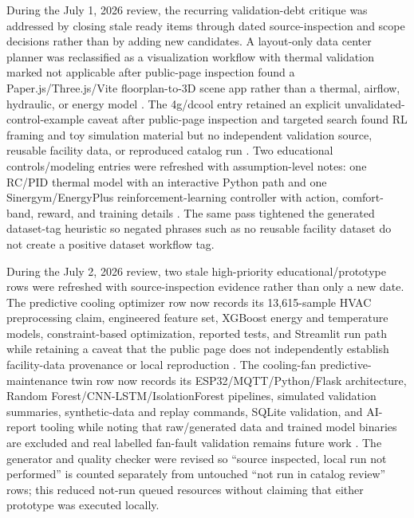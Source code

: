 \documentclass[11pt]{article}
\begin{document}
During the July 1, 2026 review, the recurring validation-debt critique was addressed by closing stale ready items through dated source-inspection and scope decisions rather than by adding new candidates. A layout-only data center planner was reclassified as a visualization workflow with thermal validation marked not applicable after public-page inspection found a Paper.js/Three.js/Vite floorplan-to-3D scene app rather than a thermal, airflow, hydraulic, or energy model \cite{DatacenterPlanner2026}. The 4g/dcool entry retained an explicit unvalidated-control-example caveat after public-page inspection and targeted search found RL framing and toy simulation material but no independent validation source, reusable facility data, or reproduced catalog run \cite{Dcool2026}. Two educational controls/modeling entries were refreshed with assumption-level notes: one RC/PID thermal model with an interactive Python path and one Sinergym/EnergyPlus reinforcement-learning controller with action, comfort-band, reward, and training details \cite{JalalCoolingDynamic2026,LucabrCoolingController2026}. The same pass tightened the generated dataset-tag heuristic so negated phrases such as no reusable facility dataset do not create a positive dataset workflow tag.

During the July 2, 2026 review, two stale high-priority educational/prototype rows were refreshed with source-inspection evidence rather than only a new date. The predictive cooling optimizer row now records its 13,615-sample HVAC preprocessing claim, engineered feature set, XGBoost energy and temperature models, constraint-based optimization, reported tests, and Streamlit run path while retaining a caveat that the public page does not independently establish facility-data provenance or local reproduction \cite{PredictiveCoolingOptimizer2026}. The cooling-fan predictive-maintenance twin row now records its ESP32/MQTT/Python/Flask architecture, Random Forest/CNN-LSTM/IsolationForest pipelines, simulated validation summaries, synthetic-data and replay commands, SQLite validation, and AI-report tooling while noting that raw/generated data and trained model binaries are excluded and real labelled fan-fault validation remains future work \cite{CoolingFanPredictiveMaintenanceTwin2026}. The generator and quality checker were revised so ``source inspected, local run not performed'' is counted separately from untouched ``not run in catalog review'' rows; this reduced not-run queued resources without claiming that either prototype was executed locally.
\end{document}
